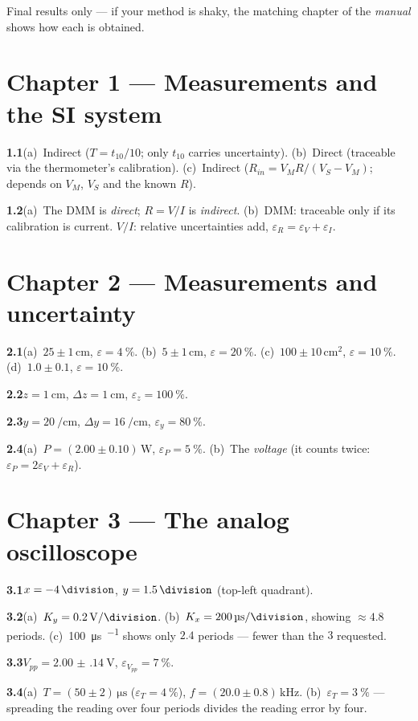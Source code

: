 \documentclass[11pt,a4paper,oneside]{book}
\newcommand{\ans}[1]{\par\smallskip\noindent\textbf{#1}\quad\ignorespaces}
\begin{document}
Final results only --- if your method is shaky, the matching chapter of the
\emph{manual} shows how each is obtained.

\section*{Chapter 1 --- Measurements and the SI system}
\ans{1.1}(a)~Indirect ($T=t_{10}/10$; only $t_{10}$ carries uncertainty).
(b)~Direct (traceable via the thermometer's calibration).
(c)~Indirect ($R_{in}=V_M R/(V_S-V_M)$; depends on $V_M$, $V_S$ and the known
$R$).
\ans{1.2}(a)~The DMM is \emph{direct}; $R=V/I$ is \emph{indirect}.
(b)~DMM: traceable only if its calibration is current. $V/I$: relative
uncertainties add, $\varepsilon_R=\varepsilon_V+\varepsilon_I$.

\section*{Chapter 2 --- Measurements and uncertainty}
\ans{2.1}(a)~$25\pm1\,\unit{\centi\meter}$, $\varepsilon=\qty{4}{\percent}$.
(b)~$5\pm1\,\unit{\centi\meter}$, $\varepsilon=\qty{20}{\percent}$.
(c)~$100\pm10\,\unit{\centi\meter\squared}$, $\varepsilon=\qty{10}{\percent}$.
(d)~$1.0\pm0.1$, $\varepsilon=\qty{10}{\percent}$.
\ans{2.2}$z=\qty{1}{\centi\meter}$, $\Delta z=\qty{1}{\centi\meter}$,
$\varepsilon_z=\qty{100}{\percent}$.
\ans{2.3}$y=\qty{20}{\per\centi\meter}$, $\Delta y=\qty{16}{\per\centi\meter}$,
$\varepsilon_y=\qty{80}{\percent}$.
\ans{2.4}(a)~$P=(2.00\pm0.10)\,\unit{\watt}$, $\varepsilon_P=\qty{5}{\percent}$.
(b)~The \emph{voltage} (it counts twice: $\varepsilon_P=2\varepsilon_V+\varepsilon_R$).

\section*{Chapter 3 --- The analog oscilloscope}
\ans{3.1}$x=-4\,\unit{\division}$, $y=1.5\,\unit{\division}$ (top-left quadrant).
\ans{3.2}(a)~$K_y=\qty{0.2}{\volt\per\division}$.
(b)~$K_x=\qty{200}{\micro\second\per\division}$, showing $\approx4.8$ periods.
(c)~\qty{100}{\micro\second\per\division} shows only $2.4$ periods --- fewer than
the $3$ requested.
\ans{3.3}$V_{pp}=\qty{2.00(14)}{\volt}$, $\varepsilon_{V_{pp}}=\qty{7}{\percent}$.
\ans{3.4}(a)~$T=(50\pm2)\,\unit{\micro\second}$ ($\varepsilon_T=\qty{4}{\percent}$),
$f=(20.0\pm0.8)\,\unit{\kilo\hertz}$.
(b)~$\varepsilon_T=\qty{3}{\percent}$ --- spreading the reading over four periods
divides the reading error by four.
\end{document}
